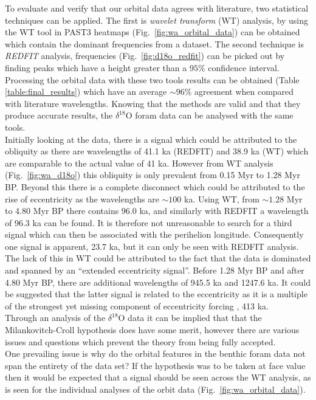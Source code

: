 \documentclass[12pt, onecolumn]{revtex4}    %
\begin{document}
To evaluate and verify that our orbital data agrees with literature, two statistical techniques can be applied. The first is \textit{wavelet transform} (WT) analysis, by using the WT tool in PAST3 \cite{past3} heatmaps (Fig.~\ref{fig:wa_orbital_data}) can be obtained which contain the dominant frequencies from a dataset. The second technique is \textit{REDFIT} analysis, frequencies (Fig.~\ref{fig:d18o_redfit}) can be picked out by finding peaks which have a height greater than a $95\%$ confidence interval. Processing the orbital data with these two tools results can be obtained (Table \ref{table:final_results}) which have an average $\sim 96 \%$ agreement when compared with literature wavelengths. Knowing that the methods are valid and that they produce accurate results, the $\delta^{18}$O foram data can be analysed with the same tools. \\

Initially looking at the data, there is a signal which could be attributed to the obliquity as there are wavelengths of 41.1 ka (REDFIT) and 38.9 ka (WT) which are comparable to the actual value of 41 ka. However from WT analysis (Fig.~\ref{fig:wa_d18o}) this obliquity is only prevalent from 0.15 Myr to 1.28 Myr BP. Beyond this there is a complete disconnect which could be attributed to the rise of eccentricity as the wavelengths are $\sim 100$ ka. Using WT, from $\sim 1.28$ Myr to 4.80 Myr BP there contains 96.0 ka, and similarly with REDFIT a wavelength of 96.3 ka can be found.  It is therefore not unreasonable to search for a third signal which can then be associated with the perihelion longitude. Consequently one signal is apparent, 23.7 ka, but it can only be seen with REDFIT analysis. The lack of this in WT could be attributed to the fact that the data is dominated and spanned by an ``extended eccentricity signal''. Before 1.28 Myr BP and after 4.80 Myr BP, there are additional wavelengths of 945.5 ka and 1247.6 ka. It could be suggested that the latter signal is related to the eccentricity as it is a multiple of the strongest yet missing component of eccentricity forcing \cite{berger_climate}, 413 ka. \\

Through an analysis of the $\delta^{18}$O data it can be implied that that the Milankovitch-Croll hypothesis does have some merit, however there are various issues and questions which prevent the theory from being fully accepted. \\

One prevailing issue is why do the orbital features in the benthic foram data not span the entirety of the data set? If the hypothesis was to be taken at face value then it would be expected that a signal should be seen across the WT analysis, as is seen for the individual analyses of the orbit data (Fig.~\ref{fig:wa_orbital_data}). \\
\end{document}
